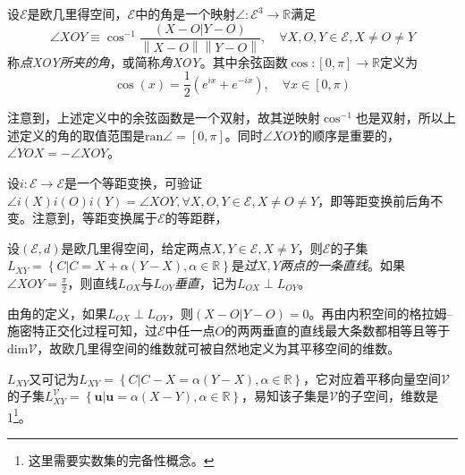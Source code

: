 \documentclass[main.tex]{subfiles}
\begin{document}
\begin{definition}[角]\label{def:II.3.6}
    设$\mathcal{E}$是欧几里得空间，$\mathcal{E}$中的角是一个映射$\angle:\mathcal{E}^3\rightarrow\mathbb{R}$满足
    \[\angle XOY\equiv\cos^{-1}\frac{\left(X-O|Y-O\right)}{\left\|X-O\right\|\left\|Y-O\right\|},\quad\forall X,O,Y\in\mathcal{E},X\neq O\neq Y\]
    称\emph{点XOY所夹的角}，或简称\emph{角XOY}。其中余弦函数$\cos:\left[0,\pi\right]\rightarrow\mathbb{R}$定义为
    \[\cos\left(x\right)=\frac{1}{2}\left(e^{ix}+e^{-ix}\right),\quad\forall x\in\left[0,\pi\right)\]
\end{definition}

注意到，上述定义中的余弦函数是一个双射，故其逆映射$\cos^{-1}$也是双射，所以上述定义的角的取值范围是$\mathrm{ran}\angle=\left[0,\pi\right]$。同时$\angle XOY$的顺序是重要的，$\angle YOX=-\angle XOY$。


设$i:\mathcal{E}\rightarrow\mathcal{E}$是一个等距变换，可验证$\angle i\left(X\right)i\left(O\right)i\left(Y\right)=\angle XOY,\forall X,O,Y\in\mathcal{E},X\neq O\neq Y$，即等距变换前后角不变。注意到，等距变换属于$\mathcal{E}$的等距群，

\begin{definition}[过两点的直线]\label{def:II.3.7}
    设$\left(\mathcal{E},d\right)$是欧几里得空间，给定两点$X,Y\in\mathcal{E},X\neq Y$，则$\mathcal{E}$的子集$L_{XY}=\left\{C|C=X+\alpha\left(Y-X\right),\alpha\in\mathbb{R}\right\}$是\emph{过}$X,Y$\emph{两点的一条直线}。如果$\angle XOY=\frac{\pi}{2}$，则直线$L_{OX}$与$L_{OY}$\emph{垂直}，记为$L_{OX}\perp L_{OY}$。
\end{definition}

由角的定义，如果$L_{OX}\perp L_{OY}$，则$\left(X-O|Y-O\right)=0$。再由内积空间的格拉姆--施密特正交化过程可知，过$\mathcal{E}$中任一点$O$的两两垂直的直线最大条数都相等且等于$\mathrm{dim}\mathcal{V}$，故欧几里得空间的维数就可被自然地定义为其平移空间的维数。

$L_{XY}$又可记为$L_{XY}=\left\{C|C-X=\alpha\left(Y-X\right),\alpha\in\mathbb{R}\right\}$，它对应着平移向量空间$\mathcal{V}$的子集$L^{\mathcal{V}}_{XY}=\left\{\mathbf{u}|\mathbf{u}=\alpha\left(X-Y\right),\alpha\in\mathbb{R}\right\}$，易知该子集是$\mathcal{V}$的子空间，维数是1\footnote{这里需要实数集的完备性概念。}。
\end{document}
